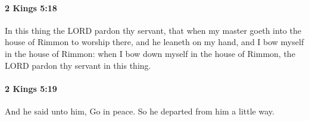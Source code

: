 		\paragraph{2 Kings 5:18} %
			\label{2KINGS-5-18}

			In this thing the LORD pardon thy servant, that when my master goeth into the house of Rimmon to worship there, and he leaneth on my hand, and I bow myself in the house of Rimmon: when I bow down myself in the house of Rimmon, the LORD pardon thy servant in this thing.


		\paragraph{2 Kings 5:19} %
			\label{2KINGS-5-19}

			And he said unto him, Go in peace. So he departed from him a little way.


